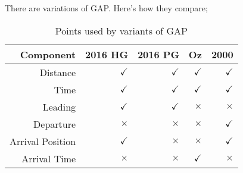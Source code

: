 \documentclass[gap.tex]{subfiles}
\begin{document}
There are variations of GAP. Here's how they compare;
\begin{table}[!ht]
    \begin{tabularx}{\textwidth}{|R|r|r|r|r|}
    \hline
        \textbf{Component} & \textbf{2016 HG} & \textbf{2016 PG} & \textbf{Oz} & \textbf{2000} \\
    \hline
        Distance         & $\checkmark$ & $\checkmark$ & $\checkmark$ & $\checkmark$ \\
        Time             & $\checkmark$ & $\checkmark$ & $\checkmark$ & $\checkmark$ \\
        Leading          & $\checkmark$ & $\checkmark$ & $\times$     & $\times$ \\
        Departure        & $\times$     & $\times$     & $\times$     & $\checkmark$ \\
        Arrival Position & $\checkmark$ & $\times$     & $\times$     & $\checkmark$ \\
        Arrival Time     & $\times$     & $\times$     & $\checkmark$ & $\times$ \\
    \hline
    \end{tabularx}
    \caption{Points used by variants of GAP}
    \label{tab:gap-variants}
\end{table}
\end{document}
